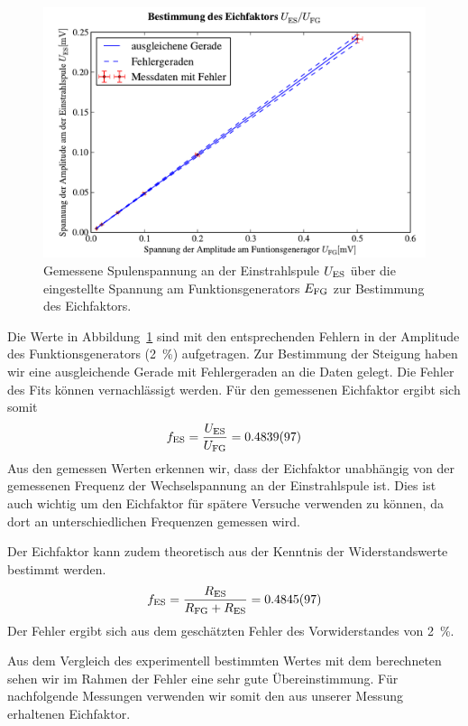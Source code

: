 \documentclass[paper=a4,
	fontsize=10pt,
	DIV=18,
	twocolumn,
	parskip=half
	]{scrartcl}
\numberwithin{equation}{section}    %
\begin{document}
\begin{figure}[htp]
	\includegraphics[width=\columnwidth]{Data-Plots/03-Effektivwert-es-fg.pdf}
	\caption{Gemessene Spulenspannung an der Einstrahlspule $U_{\rm ES}$ über die eingestellte Spannung am Funktionsgenerators $E_{\rm FG}$ zur Bestimmung des Eichfaktors.}
	\label{fig.eichfaktor}
\end{figure}

Die Werte in Abbildung~\ref{fig.eichfaktor} sind mit den entsprechenden Fehlern in der Amplitude des Funktionsgenerators (\SI{2}{\percent}) aufgetragen. Zur Bestimmung der Steigung haben wir eine ausgleichende Gerade mit Fehlergeraden an die Daten gelegt. Die Fehler des Fits können vernachlässigt werden.
Für den gemessenen Eichfaktor ergibt sich somit
\begin{equation}
	f_{\rm ES} = \frac{U_{\rm ES}}{U_{\rm FG}} = \SI{0.4839(97)}{}
\end{equation}
Aus den gemessen Werten erkennen wir, dass der Eichfaktor unabhängig von der gemessenen Frequenz der Wechselspannung an der Einstrahlspule ist. Dies ist auch wichtig um den Eichfaktor für spätere Versuche verwenden zu können, da dort an unterschiedlichen Frequenzen gemessen wird.

Der Eichfaktor kann zudem theoretisch aus der Kenntnis der Widerstandswerte bestimmt werden. 
\begin{equation}
	f_{\rm ES} = \frac{R_{\rm ES}}{R_{\rm FG}+R_{\rm ES}} = \SI{0.4845(97)}{}
\end{equation}
Der Fehler ergibt sich aus dem geschätzten Fehler des Vorwiderstandes von \SI{2}{\percent}.

Aus dem Vergleich des experimentell bestimmten Wertes mit dem berechneten sehen wir im Rahmen der Fehler eine sehr gute Übereinstimmung. Für nachfolgende Messungen verwenden wir somit den aus unserer Messung erhaltenen Eichfaktor.
\end{document}
